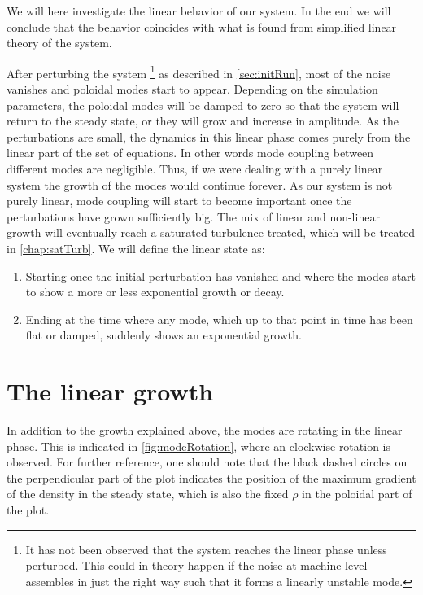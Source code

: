 %
We will here investigate the linear behavior of our system.
In the end we will conclude that the behavior coincides with what is found from simplified linear theory of the system.

After perturbing the system%
\footnote{It has not been observed that the system reaches the linear phase unless perturbed.
    This could in theory happen if the noise at machine level assembles in just the right way such that it forms a linearly unstable mode.}
%
as described in \cref{sec:initRun}, most of the noise vanishes and poloidal modes start to appear.
Depending on the simulation parameters, the poloidal modes will be damped to zero so that the system will return to the steady state, or they will grow and increase in amplitude.
As the perturbations are small, the dynamics in this linear phase comes purely from the linear part of the set of equations.
In other words mode coupling between different modes are negligible.
Thus, if we were dealing with a purely linear system the growth of the modes would continue forever.
As our system is not purely linear, mode coupling will start to become important once the perturbations have grown sufficiently big.
The mix of linear and non-linear growth will eventually reach a saturated turbulence treated, which will be treated in \cref{chap:satTurb}.
We will define the linear state as:
%
\begin{enumerate}[noitemsep]
    \item Starting once the initial perturbation has vanished and where the modes start to show a more or less exponential growth or decay.
    \item Ending at the time where any mode, which up to that point in time has been flat or damped, suddenly shows an exponential growth.
\end{enumerate}
%

\section{The linear growth}
%
In addition to the growth explained above, the modes are rotating in the linear phase.
This is indicated in \cref{fig:modeRotation}, where an clockwise rotation is observed.
For further reference, one should note that the black dashed circles on the perpendicular part of the plot indicates the position of the maximum gradient of the density in the steady state, which is also the fixed $\rho$ in the poloidal part of the plot.

